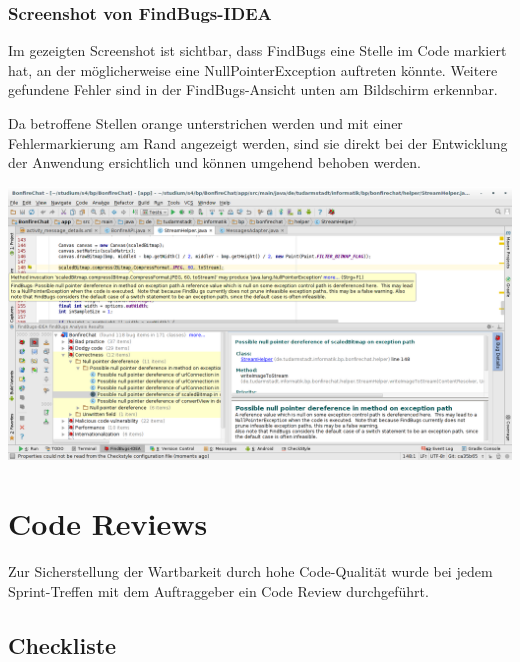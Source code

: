 \subsubsection{Screenshot von FindBugs-IDEA}

Im gezeigten Screenshot ist sichtbar, dass FindBugs eine Stelle im Code markiert hat, an der möglicherweise eine NullPointerException auftreten könnte. Weitere gefundene Fehler sind in der FindBugs-Ansicht unten am Bildschirm erkennbar.

Da betroffene Stellen orange unterstrichen werden und mit einer Fehlermarkierung am Rand angezeigt werden, sind sie direkt bei der Entwicklung der Anwendung ersichtlich und können umgehend behoben werden.

\includegraphics[width=17.5cm]{belege/findbugs/findbugs-idea-screenshot.png}


\clearpage


\section{Code Reviews}

Zur Sicherstellung der Wartbarkeit durch hohe Code-Qualität wurde bei jedem
Sprint-Treffen mit dem Auftraggeber ein Code Review durchgeführt.


\subsection{Checkliste}




